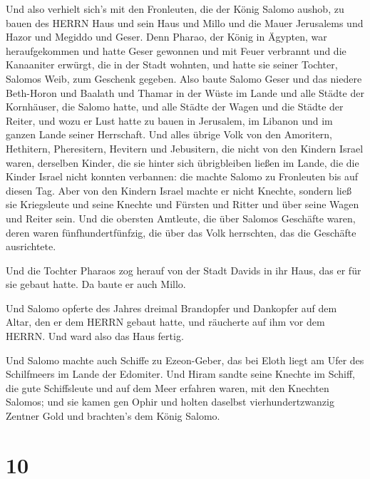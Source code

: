  Und also verhielt sich's mit den Fronleuten, die der König
Salomo aushob, zu bauen des HERRN Haus und sein Haus und Millo und die
Mauer Jerusalems und Hazor und Megiddo und Geser.  Denn
Pharao, der König in Ägypten, war heraufgekommen und hatte Geser
gewonnen und mit Feuer verbrannt und die Kanaaniter erwürgt, die in der
Stadt wohnten, und hatte sie seiner Tochter, Salomos Weib, zum Geschenk
gegeben.  Also baute Salomo Geser und das niedere
Beth-Horon  und Baalath und Thamar in der Wüste im Lande
 und alle Städte der Kornhäuser, die Salomo hatte, und alle
Städte der Wagen und die Städte der Reiter, und wozu er Lust hatte zu
bauen in Jerusalem, im Libanon und im ganzen Lande seiner Herrschaft.
 Und alles übrige Volk von den Amoritern, Hethitern,
Pheresitern, Hevitern und Jebusitern, die nicht von den Kindern Israel
waren,  derselben Kinder, die sie hinter sich übrigbleiben
ließen im Lande, die die Kinder Israel nicht konnten verbannen: die
machte Salomo zu Fronleuten bis auf diesen Tag.  Aber von
den Kindern Israel machte er nicht Knechte, sondern ließ sie Kriegsleute
und seine Knechte und Fürsten und Ritter und über seine Wagen und Reiter
sein.  Und die obersten Amtleute, die über Salomos
Geschäfte waren, deren waren fünfhundertfünfzig, die über das Volk
herrschten, das die Geschäfte ausrichtete.

 Und die Tochter Pharaos zog herauf von der Stadt Davids in
ihr Haus, das er für sie gebaut hatte. Da baute er auch Millo.

 Und Salomo opferte des Jahres dreimal Brandopfer und
Dankopfer auf dem Altar, den er dem HERRN gebaut hatte, und räucherte
auf ihm vor dem HERRN. Und ward also das Haus fertig.

 Und Salomo machte auch Schiffe zu Ezeon-Geber, das bei
Eloth liegt am Ufer des Schilfmeers im Lande der Edomiter. 
Und Hiram sandte seine Knechte im Schiff, die gute Schiffsleute und auf
dem Meer erfahren waren, mit den Knechten Salomos;  und sie
kamen gen Ophir und holten daselbst vierhundertzwanzig Zentner Gold und
brachten's dem König Salomo.

\hypertarget{section-9}{%
\section{10}\label{section-9}}

